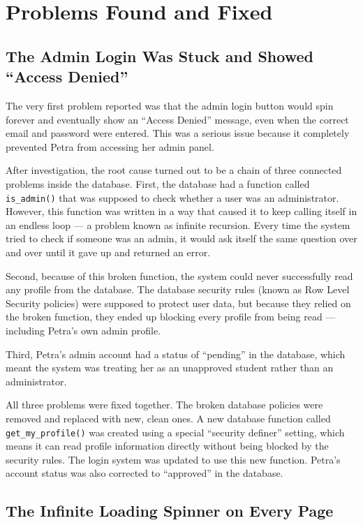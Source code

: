 \documentclass[12pt, a4paper]{article}
\begin{document}
\section{Problems Found and Fixed}

\subsection{The Admin Login Was Stuck and Showed ``Access Denied''}

The very first problem reported was that the admin login button would spin forever and eventually show an ``Access Denied'' message, even when the correct email and password were entered. This was a serious issue because it completely prevented Petra from accessing her admin panel.

After investigation, the root cause turned out to be a chain of three connected problems inside the database. First, the database had a function called \texttt{is\_admin()} that was supposed to check whether a user was an administrator. However, this function was written in a way that caused it to keep calling itself in an endless loop --- a problem known as infinite recursion. Every time the system tried to check if someone was an admin, it would ask itself the same question over and over until it gave up and returned an error.

Second, because of this broken function, the system could never successfully read any profile from the database. The database security rules (known as Row Level Security policies) were supposed to protect user data, but because they relied on the broken function, they ended up blocking every profile from being read --- including Petra's own admin profile.

Third, Petra's admin account had a status of ``pending'' in the database, which meant the system was treating her as an unapproved student rather than an administrator.

All three problems were fixed together. The broken database policies were removed and replaced with new, clean ones. A new database function called \texttt{get\_my\_profile()} was created using a special ``security definer'' setting, which means it can read profile information directly without being blocked by the security rules. The login system was updated to use this new function. Petra's account status was also corrected to ``approved'' in the database.

\subsection{The Infinite Loading Spinner on Every Page}
\end{document}
